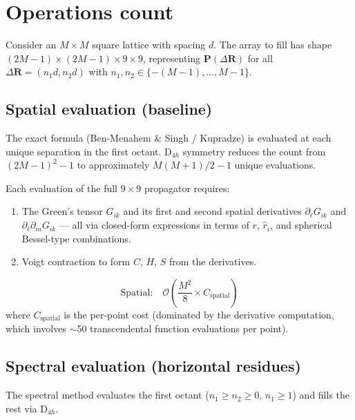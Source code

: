 \documentclass[11pt,a4paper]{article}
\newcommand{\bP}{\mathbf{P}}
\newcommand{\order}[1]{\mathcal{O}\!\left(#1\right)}
\newcommand{\bR}{\mathbf{R}}
\begin{document}
\section{Operations count}\label{sec:ops}

Consider an $M \times M$ square lattice with spacing $d$.
The array to fill has shape $(2M{-}1) \times (2M{-}1) \times
9 \times 9$, representing $\bP(\Delta\bR)$ for all
$\Delta\bR = (n_1 d, n_2 d)$ with $n_1, n_2 \in
\{-(M{-}1), \dots, M{-}1\}$.

\subsection{Spatial evaluation (baseline)}

The exact formula (Ben-Menahem \& Singh / Kupradze) is evaluated
at each unique separation in the first octant.  D$_{4h}$ symmetry
reduces the count from $(2M{-}1)^2 - 1$ to approximately
$M(M{+}1)/2 - 1$ unique evaluations.

Each evaluation of the full $9\times 9$ propagator requires:
\begin{enumerate}
\item The Green's tensor $G_{ik}$ and its first and second spatial
  derivatives $\partial_\ell G_{ik}$ and
  $\partial_\ell\partial_m G_{ik}$ --- all via closed-form
  expressions in terms of $r$, $\hat{r}_i$, and spherical Bessel-type
  combinations.
\item Voigt contraction to form $C$, $H$, $S$ from the derivatives.
\end{enumerate}

\begin{equation}\label{eq:spatial_cost}
  \boxed{
  \text{Spatial:}\quad
  \order{\frac{M^2}{8} \times C_{\text{spatial}}}
  }
\end{equation}
where $C_{\text{spatial}}$ is the per-point cost (dominated by
the derivative computation, which involves $\sim$50 transcendental
function evaluations per point).

\subsection{Spectral evaluation (horizontal residues)}

The spectral method evaluates the first octant
($n_1 \ge n_2 \ge 0$, $n_1 \ge 1$) and fills the
rest via D$_{4h}$.
\end{document}
